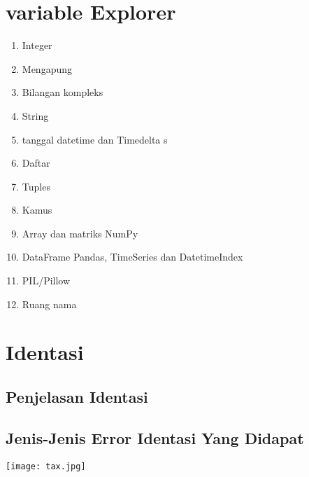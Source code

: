\documentclass{article}
\begin{document}
\section{variable Explorer}
\usepackage{Explorer Variabel memperlihatkan konten  yang semua referensi objek global, seperti variabel, fungsi, modul, dll. Dari sesi Konsol Python yang saat ini dipilih, dan memungkinkan Anda untuk berkolerasi dengan mereka melalui editor berbasis GUI. Variable Explorer mempunyai editor khusus untuk serangkaian objek Python internal dan pihak ketiga umum, dan dapat melihat, mengedit, dan mengintrospeksi objek paling sewenang-wenang melalui objek Penjelajah objek yang lebih umum. Jenis dengan dukungan pengeditan khusus meliputi:}
\begin{enumerate}
    \item Integer
    \item Mengapung
    \item Bilangan kompleks
    \item String
    \item tanggal datetime dan Timedelta s
    \item Daftar
    \item Tuples
    \item Kamus
    \item Array dan matriks NumPy
    \item DataFrame Pandas, TimeSeries dan DatetimeIndex
    \item PIL/Pillow
    \item Ruang nama
    \end{enumerate}

\section{Identasi}
\subsection{Penjelasan Identasi}
\usepackage{Di dalam Bahasa pemrograman Python manfaat identasi adalah sebagai menutup atau membuka suatu fungsi.}

\subsection{Jenis-Jenis Error Identasi Yang Didapat}
\begin{center}
        \texttt{[image: tax.jpg]}
    \end{center}
    
\usepackage{Keadaan error sering kita jumpai di dalam suatu syntax oleh sebab itu diperlukan adanya ketelitian dalam penulisan seperti penulisan tanda baca, type data, dan lain-lain. cara menangani errornya perlu adanya perbaikan, dicek ulang dengan teliti.}
\end{document}
